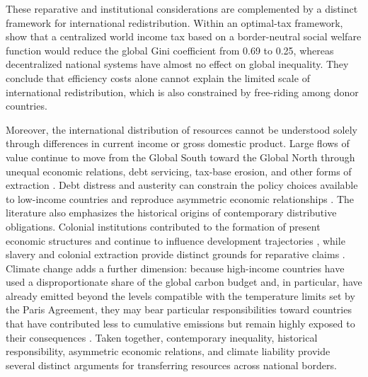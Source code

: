 \documentclass[11pt,a4paper]{article}
\begin{document}
These reparative and institutional considerations are complemented by a distinct framework for international redistribution. Within an optimal-tax framework, \citet{kopczuk_limitations_2005} show that a centralized world income tax based on a border-neutral social welfare function would reduce the global Gini coefficient from 0.69 to 0.25, whereas decentralized national systems have almost no effect on global inequality. They conclude that efficiency costs alone cannot explain the limited scale of international redistribution, which is also constrained by free-riding among donor countries.

Moreover, the international distribution of resources cannot be understood solely through differences in current income or gross domestic product. Large flows of value continue to move from the Global South toward the Global North through unequal economic relations, debt servicing, tax-base erosion, and other forms of extraction \citep{hickel_plunder_2021}. Debt distress and austerity can constrain the policy choices available to low-income countries and reproduce asymmetric economic relationships \citep{fischer_return_2023}. The literature also emphasizes the historical origins of contemporary distributive obligations. Colonial institutions contributed to the formation of present economic structures and continue to influence development trajectories \citep{bhambra_colonial_2021}, while slavery and colonial extraction provide distinct grounds for reparative claims \citep{solbiac_britains_2015,darity_cumulative_2022}. Climate change adds a further dimension: because high-income countries have used a disproportionate share of the global carbon budget and, in particular, have already emitted beyond the levels compatible with the temperature limits set by the Paris Agreement, they may bear particular responsibilities toward countries that have contributed less to cumulative emissions but remain highly exposed to their consequences \citep{fanning_compensation_2023,Hickel_and_Zoomkawala_2026}. Taken together, contemporary inequality, historical responsibility, asymmetric economic relations, and climate liability provide several distinct arguments for transferring resources across national borders.
\end{document}
